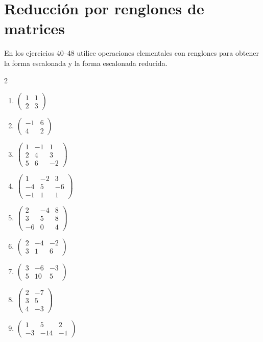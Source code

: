 \documentclass[12pt]{article}
\begin{document}
\section{Reducción por renglones de matrices}

En los ejercicios 40--48 utilice operaciones elementales con renglones para obtener
la forma escalonada y la forma escalonada reducida.

\begin{multicols}{2}
\begin{enumerate}[label=\textbf{\arabic*.},start=40,leftmargin=*]
\item $\begin{pmatrix}1&1\\2&3\end{pmatrix}$
\item $\begin{pmatrix}-1&6\\4&2\end{pmatrix}$
\item $\begin{pmatrix}1&-1&1\\2&4&3\\5&6&-2\end{pmatrix}$
\item $\begin{pmatrix}1&-2&3\\-4&5&-6\\-1&1&1\end{pmatrix}$
\item $\begin{pmatrix}2&-4&8\\3&5&8\\-6&0&4\end{pmatrix}$
\item $\begin{pmatrix}2&-4&-2\\3&1&6\end{pmatrix}$
\item $\begin{pmatrix}3&-6&-3\\5&10&5\end{pmatrix}$
\item $\begin{pmatrix}2&-7\\3&5\\4&-3\end{pmatrix}$
\item $\begin{pmatrix}1&5&2\\-3&-14&-1\end{pmatrix}$
\end{enumerate}
\end{multicols}
\end{document}
